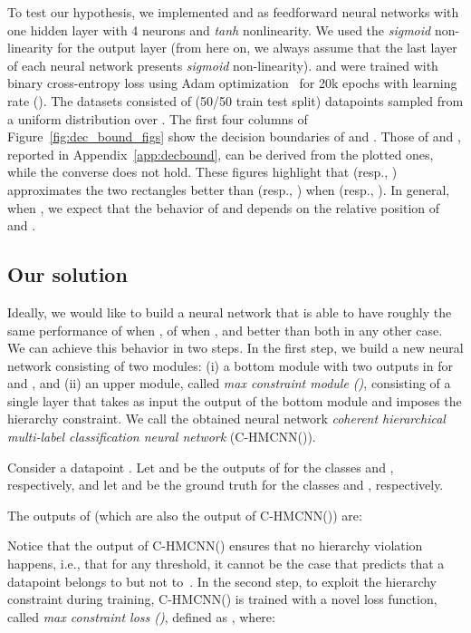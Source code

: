 \documentclass{article}
\newcommand{\module}{\text{MCM}}
\newcommand{\system}[1]{C-HMCNN(#1)}
\begin{document}
To test our hypothesis, we implemented  and  as feedforward neural networks with one hidden layer with 4 neurons and {\sl tanh} nonlinearity. We used the {\sl sigmoid} non-linearity for the output layer (from here on, we always assume that the last layer of each neural network presents {\sl sigmoid} non-linearity). 
 and  were trained with binary cross-entropy loss using Adam optimization~\citep{kingma2014} for 20k epochs with learning rate  (). The datasets consisted of  (50/50 train test split) datapoints sampled from a uniform distribution over . 
The first four columns of Figure~\ref{fig:dec_bound_figs} show the decision boundaries of  and . Those of  and , reported in Appendix~\ref{app:decbound}, can be derived from the plotted ones, while the converse does not hold. These figures highlight that  (resp., ) approximates the two rectangles better than  (resp., )  when  (resp., ).
In general, when , we expect that the behavior  of  and  depends on the relative position of  and . 

\subsection{Our solution}\label{subsec:solution}

Ideally, we would like to build a neural network that is able to have roughly the same performance of  when , of  when , and better than both in any other case. We can achieve this behavior in two steps. In the first step, we build a new neural network consisting of two modules: (i) a bottom module  with two outputs in  for  and , and (ii) an upper module, called {\sl max constraint module ()},  consisting of a single layer that takes as input the output of the bottom module and imposes the hierarchy constraint. 
We call the obtained neural network {\sl coherent hierarchical multi-label classification neural network} (\system{}). 

Consider a datapoint . Let  and  be the outputs of  for the classes  and , respectively, and let  and  be the ground truth for the classes  and , respectively. 

The outputs of {\module} (which are also the output of \system{}) are: 

Notice that the output of \system{} ensures that no hierarchy violation happens, i.e., that for any threshold, it cannot be the case that  predicts that a datapoint belongs to  but  not to~. 
In the second step, to exploit the hierarchy constraint during training, 
\system{} is trained with a novel loss function, called {\sl max constraint loss ()},
defined as , where:
\end{document}
